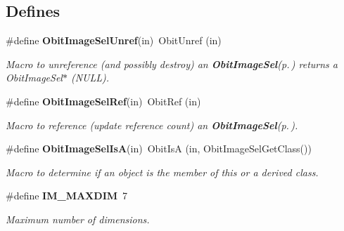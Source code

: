 \subsection*{Defines}
\begin{CompactItemize}
\item 
\#define {\bf Obit\-Image\-Sel\-Unref}(in)\ Obit\-Unref (in)
\begin{CompactList}\small\item\em Macro to unreference (and possibly destroy) an {\bf Obit\-Image\-Sel}{\rm (p.\,\pageref{structObitImageSel})} returns a Obit\-Image\-Sel$\ast$ (NULL). \item\end{CompactList}\item 
\#define {\bf Obit\-Image\-Sel\-Ref}(in)\ Obit\-Ref (in)
\begin{CompactList}\small\item\em Macro to reference (update reference count) an {\bf Obit\-Image\-Sel}{\rm (p.\,\pageref{structObitImageSel})}. \item\end{CompactList}\item 
\#define {\bf Obit\-Image\-Sel\-Is\-A}(in)\ Obit\-Is\-A (in, Obit\-Image\-Sel\-Get\-Class())
\begin{CompactList}\small\item\em Macro to determine if an object is the member of this or a derived class. \item\end{CompactList}\item 
\#define {\bf IM\_\-MAXDIM}\ 7
\begin{CompactList}\small\item\em Maximum number of dimensions. \item\end{CompactList}\end{CompactItemize}
